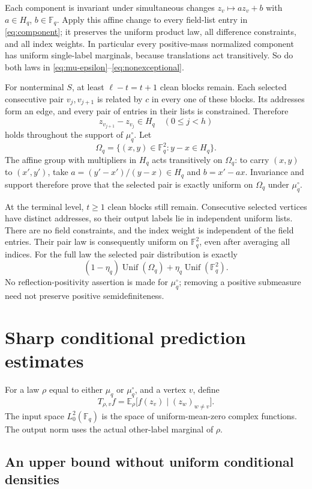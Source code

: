 \documentclass[11pt,a4paper]{article}
\numberwithin{equation}{section}
\theoremstyle{definition}
\theoremstyle{remark}
\newcommand{\E}{\mathbb E}
\newcommand{\F}{\mathbb F}
\newcommand{\Unif}{\operatorname{Unif}}
\begin{document}
Each component is invariant under simultaneous changes
$z_v\mapsto az_v+b$ with $a\in H_q$, $b\in\F_q$. Apply this affine
change to every field-list entry in \eqref{eq:component}; it preserves
the uniform product law, all difference constraints, and all index
weights. In particular every positive-mass normalized component has
uniform single-label marginals, because translations act transitively.
So do both laws in \eqref{eq:mu-epsilon}--\eqref{eq:nonexceptional}.

For nonterminal $S$, at least $\ell-t=t+1$ clean blocks remain.
Each selected consecutive pair $v_j,v_{j+1}$ is related by $c$ in every
one of these blocks. Its addresses form an edge, and every pair of
entries in their lists is constrained. Therefore
\[
 z_{v_{j+1}}-z_{v_j}\in H_q\quad(0\le j<h)
\]
holds throughout the support of $\mu_q^\circ$.
Let
\[
 \Omega_q=\{(x,y)\in\F_q^2:y-x\in H_q\}.
\]
The affine group with multipliers in $H_q$ acts transitively on
$\Omega_q$: to carry $(x,y)$ to $(x',y')$, take
$a=(y'-x')/(y-x)\in H_q$ and $b=x'-ax$. Invariance and support
therefore prove that the selected pair is exactly uniform on $\Omega_q$
under $\mu_q^\circ$.

At the terminal level, $t\ge1$ clean blocks still remain. Consecutive
selected vertices have distinct addresses, so their output labels lie
in independent uniform lists. There are no field constraints, and
the index weight is independent of the field entries. Their pair law
is consequently uniform on $\F_q^2$, even after averaging all indices.
For the full law the selected pair distribution is exactly
\begin{equation}
 (1-\eta_q)\Unif(\Omega_q)+\eta_q\Unif(\F_q^2).
 \label{eq:pairlaw}
\end{equation}
No reflection-positivity assertion is made for $\mu_q^\circ$; removing
a positive submeasure need not preserve positive semidefiniteness.

\section{Sharp conditional prediction estimates}
\label{sec:mixing}

For a law $\rho$ equal to either $\mu_q$ or $\mu_q^\circ$, and a
vertex $v$, define
\[
 T_{\rho,v}f
 =\E_\rho\bigl[f(z_v)\mid(z_w)_{w\ne v}\bigr].
\]
The input space $L^2_0(\F_q)$ is the space of uniform-mean-zero
complex functions. The output norm uses the actual other-label
marginal of $\rho$.

\subsection{An upper bound without uniform conditional densities}
\end{document}
